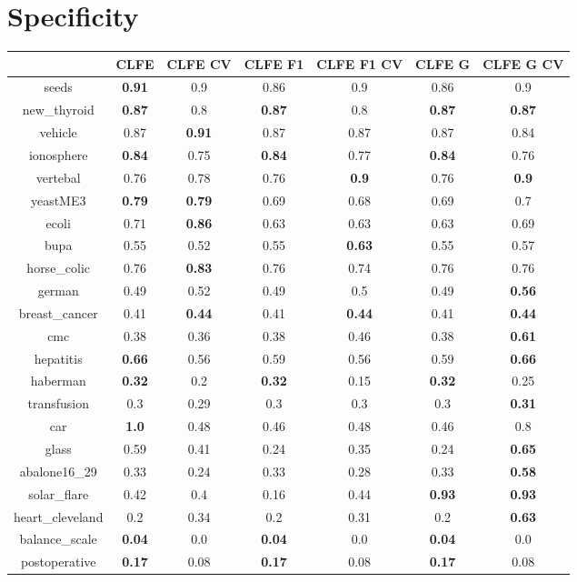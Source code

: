 \documentclass{article}%
\begin{document}
%
\section*{Specificity}%
\begin{tabular}{c|cccccc}%
\hline%
&CLFE&CLFE CV&CLFE F1&CLFE F1 CV&CLFE G&CLFE G CV\\%
\hline%
seeds&\textbf{0.91}&0.9&0.86&0.9&0.86&0.9\\%
new\_thyroid&\textbf{0.87}&0.8&\textbf{0.87}&0.8&\textbf{0.87}&\textbf{0.87}\\%
vehicle&0.87&\textbf{0.91}&0.87&0.87&0.87&0.84\\%
ionosphere&\textbf{0.84}&0.75&\textbf{0.84}&0.77&\textbf{0.84}&0.76\\%
vertebal&0.76&0.78&0.76&\textbf{0.9}&0.76&\textbf{0.9}\\%
yeastME3&\textbf{0.79}&\textbf{0.79}&0.69&0.68&0.69&0.7\\%
ecoli&0.71&\textbf{0.86}&0.63&0.63&0.63&0.69\\%
bupa&0.55&0.52&0.55&\textbf{0.63}&0.55&0.57\\%
horse\_colic&0.76&\textbf{0.83}&0.76&0.74&0.76&0.76\\%
german&0.49&0.52&0.49&0.5&0.49&\textbf{0.56}\\%
breast\_cancer&0.41&\textbf{0.44}&0.41&\textbf{0.44}&0.41&\textbf{0.44}\\%
cmc&0.38&0.36&0.38&0.46&0.38&\textbf{0.61}\\%
hepatitis&\textbf{0.66}&0.56&0.59&0.56&0.59&\textbf{0.66}\\%
haberman&\textbf{0.32}&0.2&\textbf{0.32}&0.15&\textbf{0.32}&0.25\\%
transfusion&0.3&0.29&0.3&0.3&0.3&\textbf{0.31}\\%
car&\textbf{1.0}&0.48&0.46&0.48&0.46&0.8\\%
glass&0.59&0.41&0.24&0.35&0.24&\textbf{0.65}\\%
abalone16\_29&0.33&0.24&0.33&0.28&0.33&\textbf{0.58}\\%
solar\_flare&0.42&0.4&0.16&0.44&\textbf{0.93}&\textbf{0.93}\\%
heart\_cleveland&0.2&0.34&0.2&0.31&0.2&\textbf{0.63}\\%
balance\_scale&\textbf{0.04}&0.0&\textbf{0.04}&0.0&\textbf{0.04}&0.0\\%
postoperative&\textbf{0.17}&0.08&\textbf{0.17}&0.08&\textbf{0.17}&0.08\\%
\end{tabular}
\end{document}
